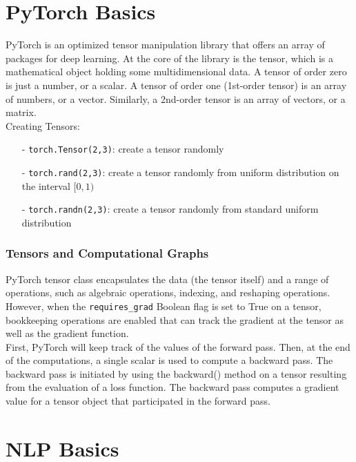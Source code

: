 \documentclass[french]{article}
\begin{document}
\section{PyTorch Basics}

PyTorch is an optimized tensor manipulation library that offers an array of packages for deep learning. At the core of the library is the tensor, which is a mathematical object holding some multidimensional data. A tensor of order zero is just a number, or a scalar. A tensor of order one (1st-order tensor) is an array of numbers, or a vector. Similarly, a 2nd-order tensor is an array of vectors, or a matrix.\\

Creating Tensors:

\begin{itemize}
    \item[-] \verb|torch.Tensor(2,3)|: create a tensor randomly
    \item[-] \verb|torch.rand(2,3)|: create a tensor randomly from uniform distribution on the interval $[0,1)$
    \item[-] \verb|torch.randn(2,3)|: create a tensor randomly from standard uniform distribution
\end{itemize}

\subsubsection{Tensors and Computational Graphs}

PyTorch tensor class encapsulates the data (the tensor itself) and a range of operations, such as algebraic operations, indexing, and reshaping operations. However, when the \verb|requires_grad| Boolean flag is set to True on a tensor, bookkeeping operations are enabled that can track the gradient at the tensor as well as the gradient function.\\

First, PyTorch will keep track of the values of the forward pass. Then, at the end of the computations, a single scalar is used to compute a backward pass. The backward pass is initiated by using the backward() method on a tensor resulting from the evaluation of a loss function.  The backward pass computes a gradient value for a tensor object that participated in the forward pass.

\section{NLP Basics}
\end{document}
